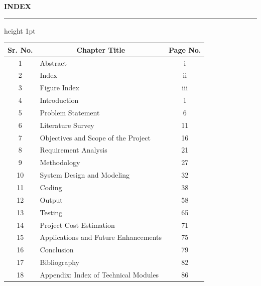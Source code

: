 \begin{center}
{\LARGE\bfseries INDEX}\\[0.3em]
\hrule height 1pt
\end{center}
\begin{center}
\renewcommand{\arraystretch}{1.0}
\begin{tabularx}{\textwidth}{|c|X|c|}
\hline
\textbf{Sr. No.} & \multicolumn{1}{c|}{\textbf{Chapter Title}} & \textbf{Page No.} \\ \hline
1 & Abstract & i \\ \hline
2 & Index & ii \\ \hline
3 & Figure Index & iii \\ \hline
4 & Introduction & 1 \\ \hline
5 & Problem Statement & 6 \\ \hline
6 & Literature Survey & 11 \\ \hline
7 & Objectives and Scope of the Project & 16 \\ \hline
8 & Requirement Analysis & 21 \\ \hline
9 & Methodology & 27 \\ \hline
10 & System Design and Modeling & 32 \\ \hline
11 & Coding & 38 \\ \hline
12 & Output & 58 \\ \hline
13 & Testing & 65 \\ \hline
14 & Project Cost Estimation & 71 \\ \hline
15 & Applications and Future Enhancements & 75 \\ \hline
16 & Conclusion & 79 \\ \hline
17 & Bibliography & 82 \\ \hline
18 & Appendix: Index of Technical Modules & 86 \\ \hline
\end{tabularx}
\end{center}
